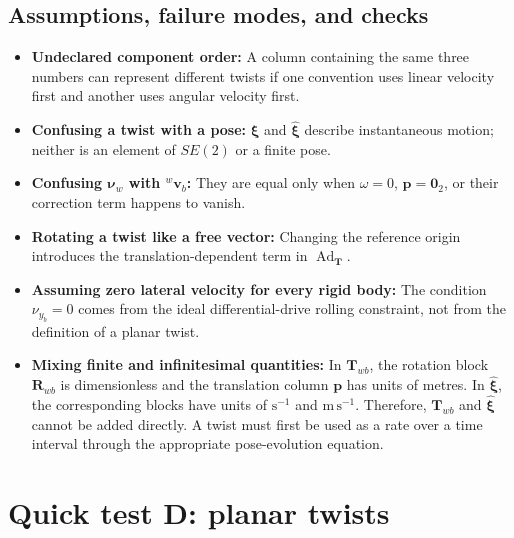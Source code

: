 \documentclass[
  australian,
  12pt,
  letterpaper,
  DIV=11,
  numbers=noendperiod,
  twoside]{scrreprt}
\providecommand{\tightlist}{%
  \setlength{\itemsep}{0pt}\setlength{\parskip}{0pt}}
\begin{document}
\subsection{Assumptions, failure modes, and
checks}\label{assumptions-failure-modes-and-checks-1}

\begin{itemize}
\tightlist
\item
  \textbf{Undeclared component order:} A column containing the same
  three numbers can represent different twists if one convention uses
  linear velocity first and another uses angular velocity first.
\item
  \textbf{Confusing a twist with a pose:} \(\boldsymbol\xi\) and
  \(\widehat{\boldsymbol\xi}\) describe instantaneous motion; neither is
  an element of \(SE(2)\) or a finite pose.
\item
  \textbf{Confusing \(\boldsymbol\nu_w\) with \({}^w\mathbf v_b\):} They
  are equal only when \(\omega=0\), \(\mathbf p=\mathbf 0_2\), or their
  correction term happens to vanish.
\item
  \textbf{Rotating a twist like a free vector:} Changing the reference
  origin introduces the translation-dependent term in
  \(\operatorname{Ad}_{\mathbf T}\).
\item
  \textbf{Assuming zero lateral velocity for every rigid body:} The
  condition \(\nu_{y_b}=0\) comes from the ideal differential-drive
  rolling constraint, not from the definition of a planar twist.
\item
  \textbf{Mixing finite and infinitesimal quantities:} In
  \(\mathbf T_{wb}\), the rotation block \(\mathbf R_{wb}\) is
  dimensionless and the translation column \(\mathbf p\) has units of
  metres. In \(\widehat{\boldsymbol\xi}\), the corresponding blocks have
  units of \(\mathrm{s^{-1}}\) and \(\mathrm{m\,s^{-1}}\). Therefore,
  \(\mathbf T_{wb}\) and \(\widehat{\boldsymbol\xi}\) cannot be added
  directly. A twist must first be used as a rate over a time interval
  through the appropriate pose-evolution equation.
\end{itemize}

\section*{Quick test D: planar twists}\label{quick-test-d-planar-twists}

\end{document}
